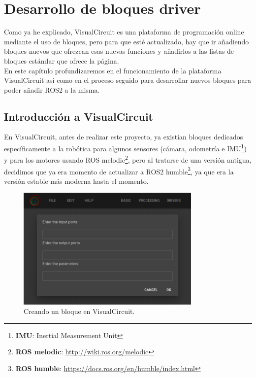 \chapter{Desarrollo de bloques driver}
\label{cap:capitulo4}
Como ya he explicado, VisualCircuit es una plataforma de programación online mediante el uso de bloques, pero para que esté actualizado, hay que ir añadiendo bloques nuevos que ofrezcan esas nuevas funciones y añadirlos a las listas de bloques estándar que ofrece la página.\\
En este capítulo profundizaremos en el funcionamiento de la plataforma VisualCircuit así como en el proceso seguido para desarrollar nuevos bloques para poder añadir ROS2 a la misma.


\section{Introducción a VisualCircuit}
\label{sec:VC_intro}

En VisualCircuit, antes de realizar este proyecto, ya existían bloques dedicados específicamente a la robótica para algunos sensores (cámara, odometría e IMU\footnote{\textbf{IMU}: Inertial Measurement Unit}) y para los motores usando ROS melodic\footnote{\textbf{ROS melodic}: \url{http://wiki.ros.org/melodic}}, pero al tratarse de una versión antigua, decidimos que ya era momento de actualizar a ROS2 humble\footnote{\textbf{ROS humble}: \url{https://docs.ros.org/en/humble/index.html}}, ya que era la versión estable más moderna hasta el momento.
\begin{figure} [H]
  \begin{center}
      \includegraphics[width=9cm]{figs/c4/VC_pre_codeblock.png}
  \end{center}
  \caption[Creando un bloque en VisualCircuit]{Creando un bloque en VisualCircuit.}
  \label{fig:VC_creando_bloque}
\end{figure}

